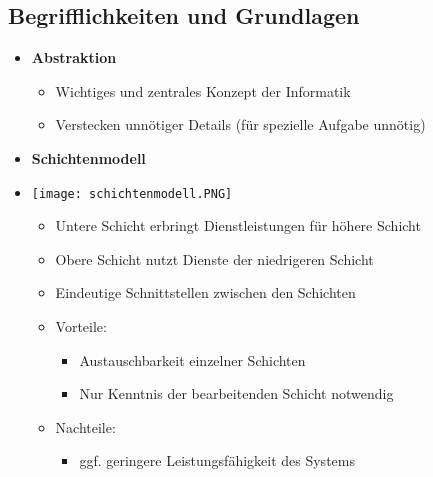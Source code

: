 \subsection{Begrifflichkeiten und Grundlagen}
    \begin{itemize}
        \item \textbf{Abstraktion}
            \begin{itemize}
                \item Wichtiges und zentrales Konzept der Informatik
                \item Verstecken unnötiger Details (für spezielle Aufgabe unnötig)
            \end{itemize}
        
        \item \textbf{Schichtenmodell}
        \item[]
            \begin{minipage}{0.3\textwidth}
            \texttt{[image: schichtenmodell.PNG]}
            \end{minipage}
            \begin{minipage}[t]{0.6\textwidth}
            \vspace{-3cm}
                \begin{itemize}
                    \item Untere Schicht erbringt Dienstleistungen für höhere Schicht
                    \item Obere Schicht nutzt Dienste der niedrigeren Schicht
                    \item Eindeutige Schnittstellen zwischen den Schichten
                    \item Vorteile:
                        \begin{itemize}
                            \item Austauschbarkeit einzelner Schichten
                            \item Nur Kenntnis der bearbeitenden Schicht notwendig
                        \end{itemize}
                    \item Nachteile:
                        \begin{itemize}
                            \item ggf. geringere Leistungsfähigkeit des Systems
                        \end{itemize}
                \end{itemize}
            \end{minipage}
        

\end{itemize}
